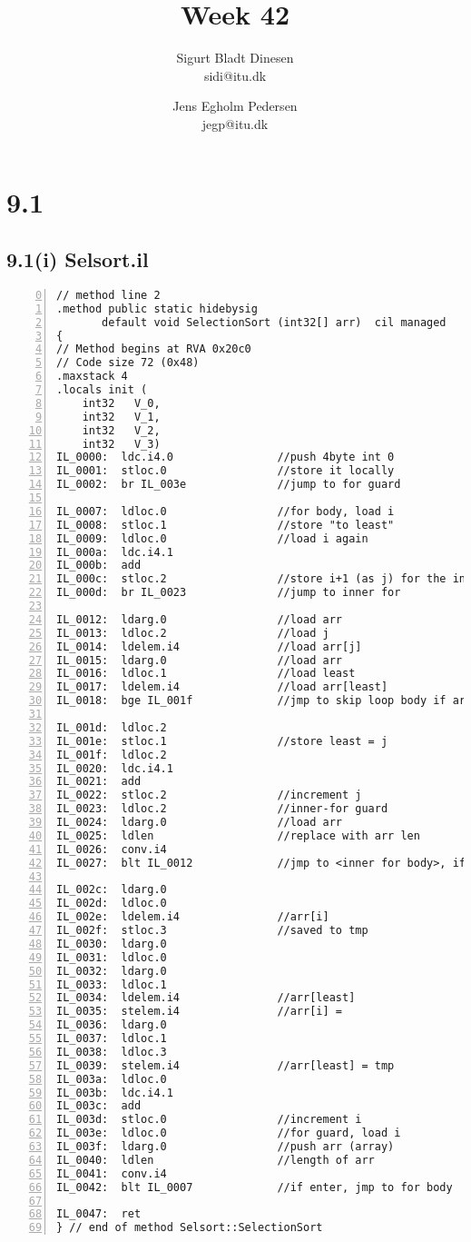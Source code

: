 \documentclass[a4paper, titlepage]{article}
\begin{document}
\title{Week 42}
\author{Sigurt Bladt Dinesen \\sidi{@}itu.dk \and Jens Egholm Pedersen \\jegp{@}itu.dk}
\maketitle
\section*{9.1}
\subsection*{9.1(i) Selsort.il}
\begin{lstlisting}[numbers=left, firstnumber=0, title=Selsort.il]
// method line 2
.method public static hidebysig 
       default void SelectionSort (int32[] arr)  cil managed 
{
// Method begins at RVA 0x20c0
// Code size 72 (0x48)
.maxstack 4
.locals init (
	int32	V_0,
	int32	V_1,
	int32	V_2,
	int32	V_3)
IL_0000:  ldc.i4.0                //push 4byte int 0
IL_0001:  stloc.0                 //store it locally
IL_0002:  br IL_003e              //jump to for guard

IL_0007:  ldloc.0                 //for body, load i
IL_0008:  stloc.1                 //store "to least"
IL_0009:  ldloc.0                 //load i again
IL_000a:  ldc.i4.1
IL_000b:  add 
IL_000c:  stloc.2                 //store i+1 (as j) for the inner loop
IL_000d:  br IL_0023              //jump to inner for

IL_0012:  ldarg.0                 //load arr
IL_0013:  ldloc.2                 //load j
IL_0014:  ldelem.i4               //load arr[j]
IL_0015:  ldarg.0                 //load arr
IL_0016:  ldloc.1                 //load least
IL_0017:  ldelem.i4               //load arr[least]
IL_0018:  bge IL_001f             //jmp to skip loop body if arr[j] > arr[least]

IL_001d:  ldloc.2
IL_001e:  stloc.1                 //store least = j
IL_001f:  ldloc.2
IL_0020:  ldc.i4.1
IL_0021:  add
IL_0022:  stloc.2                 //increment j
IL_0023:  ldloc.2                 //inner-for guard
IL_0024:  ldarg.0                 //load arr
IL_0025:  ldlen                   //replace with arr len
IL_0026:  conv.i4
IL_0027:  blt IL_0012             //jmp to <inner for body>, if len > arr[j]

IL_002c:  ldarg.0
IL_002d:  ldloc.0 
IL_002e:  ldelem.i4               //arr[i]
IL_002f:  stloc.3                 //saved to tmp
IL_0030:  ldarg.0
IL_0031:  ldloc.0 
IL_0032:  ldarg.0 
IL_0033:  ldloc.1 
IL_0034:  ldelem.i4               //arr[least]
IL_0035:  stelem.i4               //arr[i] =
IL_0036:  ldarg.0 
IL_0037:  ldloc.1 
IL_0038:  ldloc.3 
IL_0039:  stelem.i4               //arr[least] = tmp
IL_003a:  ldloc.0 
IL_003b:  ldc.i4.1 
IL_003c:  add 
IL_003d:  stloc.0                 //increment i
IL_003e:  ldloc.0                 //for guard, load i
IL_003f:  ldarg.0                 //push arr (array)
IL_0040:  ldlen                   //length of arr
IL_0041:  conv.i4
IL_0042:  blt IL_0007             //if enter, jmp to for body

IL_0047:  ret 
} // end of method Selsort::SelectionSort
\end{lstlisting}
\end{document}
